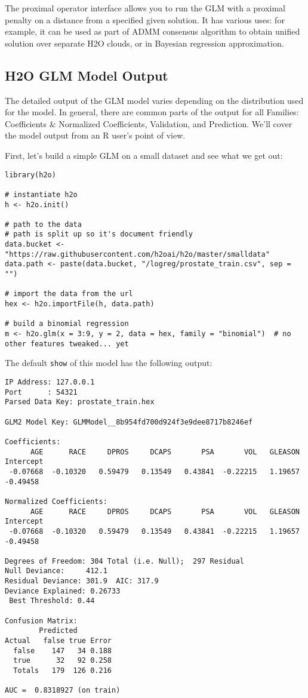 \documentclass[11pt]{article}
\begin{document}
The proximal operator interface allows you to run the GLM with a proximal penalty on a distance from a specified given solution. It has various uses: for example, it can be used as part of ADMM consensus algorithm to obtain unified solution over separate H2O clouds, or in Bayesian regression approximation.

\subsection{H2O GLM Model Output}
The detailed output of the GLM model varies depending on the distribution used for the model. In general, there are common parts of the output for all Families: Coefficients \& Normalized Coefficients, Validation, and Prediction. We'll cover the model output from an R user's  point of view.

First, let's build a simple GLM on a small dataset and see what we get out:

\begin{verbatim}
library(h2o)

# instantiate h2o
h <- h2o.init()

# path to the data
# path is split up so it's document friendly
data.bucket <- "https://raw.githubusercontent.com/h2oai/h2o/master/smalldata"
data.path <- paste(data.bucket, "/logreg/prostate_train.csv", sep = "")

# import the data from the url
hex <- h2o.importFile(h, data.path)

# build a binomial regression
m <- h2o.glm(x = 3:9, y = 2, data = hex, family = "binomial")  # no other features tweaked... yet
\end{verbatim}

The default \texttt{show} of this model has the following output:

\begin{verbatim}
IP Address: 127.0.0.1 
Port      : 54321 
Parsed Data Key: prostate_train.hex 

GLM2 Model Key: GLMModel__8b954fd700d924f3e9dee8717b8246ef

Coefficients:
      AGE      RACE     DPROS     DCAPS       PSA       VOL   GLEASON Intercept 
 -0.07668  -0.10320   0.59479   0.13549   0.43841  -0.22215   1.19657  -0.49458 

Normalized Coefficients:
      AGE      RACE     DPROS     DCAPS       PSA       VOL   GLEASON Intercept 
 -0.07668  -0.10320   0.59479   0.13549   0.43841  -0.22215   1.19657  -0.49458 

Degrees of Freedom: 304 Total (i.e. Null);  297 Residual
Null Deviance:     412.1
Residual Deviance: 301.9  AIC: 317.9
Deviance Explained: 0.26733 
 Best Threshold: 0.44

Confusion Matrix:
        Predicted
Actual   false true Error
  false    147   34 0.188
  true      32   92 0.258
  Totals   179  126 0.216

AUC =  0.8318927 (on train) 
\end{verbatim}
\end{document}
